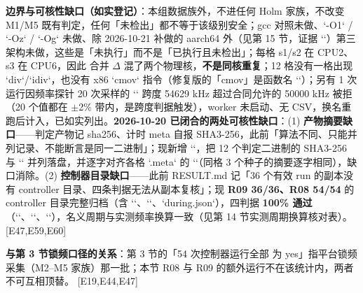 \documentclass[UTF8,fontset=fandol,11pt,a4paper]{ctexart}
\begin{document}
\textbf{边界与可核性缺口（如实登记）}：本组数据族外，不进任何 Holm 家族，不改变 M1/M5 既有判定，任何「未检出」都不等于该级别安全；gcc 对照未做、`-O1` / `-Oz` / `-Og` 未做、除 2026-10-21 补做的 aarch64 外（见第 15 节，证据 `\texttt{}`）第三架构未做，这些是「未执行」而不是「已执行且未检出」；每格 s1/s2 在 CPU2、s3 在 CPU6，因此 合并 \texorpdfstring{$\Delta$}{Delta} 混了两个物理核，\textbf{不是同核重复}；12 格没有一格出现 `div`/`idiv`，也没有 x86 `cmov` 指令（修复版的「cmov」是函数名 `\texttt{}`）；另有 1 次运行因频率探针 20 次采样的 `\texttt{}` 跨度 54629 kHz 超过合同允许的 50000 kHz 被拒（20 个值都在 \texorpdfstring{$\pm$}{+-}2\% 带内，是跨度判据触发），worker 未启动、无 CSV，换名重跑后计入，已如实列出。\textbf{2026-10-20 已闭合的两处可核性缺口}：(1) \textbf{产物摘要缺口}——判定产物记 sha256、计时 meta 自报 SHA3-256，此前「算法不同、只能并列记录、不能断言是同一二进制」；现新增 `\texttt{}`，把 12 个判定二进制的 SHA3-256 与 `\texttt{}` 并列落盘，并逐字对齐各格 `.meta` 的 `\texttt{}`（同格 3 个种子的摘要逐字相同），缺口消除。(2) \textbf{控制器目录缺口}——此前 RESULT.md 记「36 个有效 run 的副本没有 controller 目录、四条判据无法从副本复核」；现 \textbf{R09 36/36、R08 54/54} 的 controller 目录完整归档（含 `\texttt{}`、`\texttt{}`、`during.json`），四判据 \textbf{100\% 通过}（`\texttt{}`、`\texttt{}`、`\texttt{}`），名义周期与实测频率换算一致（见第 14 节实测周期换算核对表）。 [E47,E59,E60]


\textbf{与第 3 节锁频口径的关系}：第 3 节的「54 次控制器运行全部 \texttt{} 为 yes」指平台锁频采集（M2–M5 家族）那一批；本节 R08 与 R09 的额外运行不在该统计内，两者不可互相顶替。 [E19,E44,E47]
\end{document}
